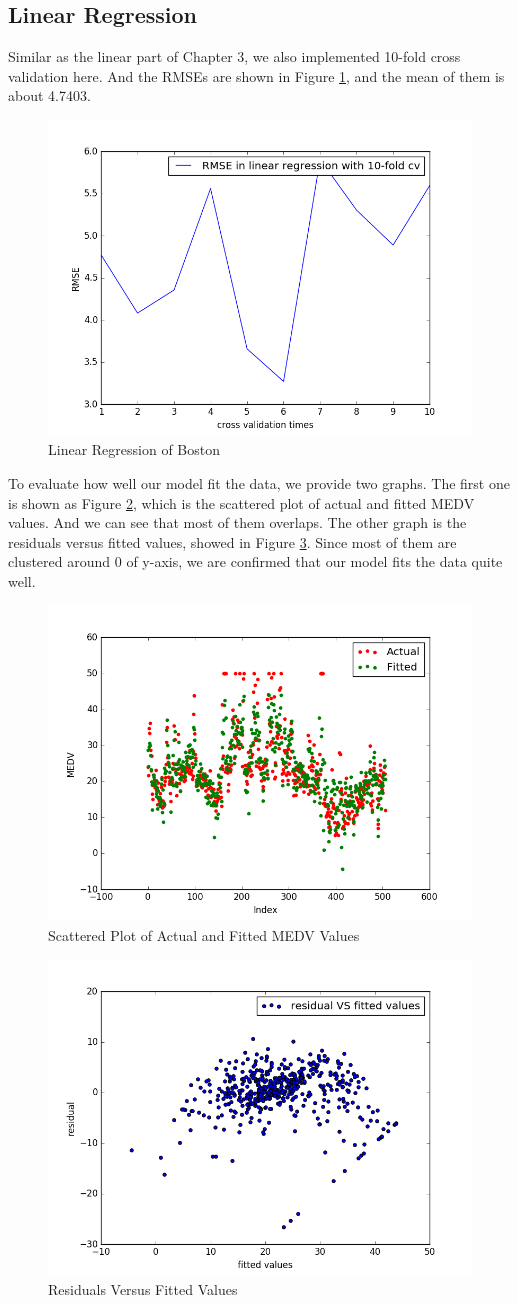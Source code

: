 \documentclass{article}
\begin{document}
\subsection{Linear Regression}
Similar as the linear part of Chapter 3, we also implemented 10-fold cross validation here. And the RMSEs are shown in Figure \ref{fig:RMSEs}, and the mean of them is about 4.7403.
\begin{figure}[htbp]
\centering
\includegraphics[width=.6\textwidth]{RMSEs.png}
\caption{Linear Regression of Boston}
\label{fig:RMSEs}
\end{figure}
To evaluate how well our model fit the data, we provide two graphs. The first one is shown as Figure \ref{fig:fitted_actual}, which is the scattered plot of actual and fitted MEDV values. And we can see that most of them overlaps. The other graph is the residuals versus fitted values, showed in Figure \ref{fig:residual_fitted}. Since most of them are clustered around 0 of y-axis, we are confirmed that our model fits the data quite well.
\begin{figure}[htbp]
\centering
\includegraphics[width=.6\textwidth]{fitted_actual.png}
\caption{Scattered Plot of Actual and Fitted MEDV Values}
\label{fig:fitted_actual}
\end{figure}
\begin{figure}[htbp]
\centering
\includegraphics[width=.6\textwidth]{residual_fitted.png}
\caption{Residuals Versus Fitted Values}
\label{fig:residual_fitted}
\end{figure}
\end{document}
